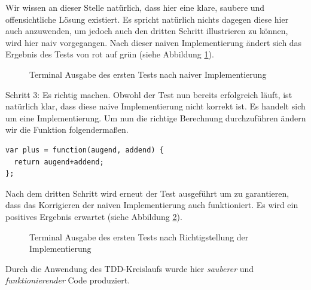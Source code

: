 Wir wissen an dieser Stelle natürlich, dass hier eine klare, saubere und offensichtliche Lösung existiert. Es spricht natürlich nichts dagegen diese hier auch anzuwenden, um jedoch auch den dritten Schritt illustrieren zu können, wird hier naiv vorgegangen.\newline
Nach dieser naiven Implementierung ändert sich das Ergebnis des Tests von rot auf grün (siehe Abbildung \ref{figure:tdd-simple-step-1-2}).

\begin{figure}[H]
  \centering
  \caption{Terminal Ausgabe des ersten Tests nach naiver Implementierung}
  \label{figure:tdd-simple-step-1-2}
\end{figure}

Schritt 3: Es richtig machen.
Obwohl der Test nun bereits erfolgreich läuft, ist natürlich klar, dass diese naive Implementierung nicht korrekt ist. Es handelt sich um eine  Implementierung. Um nun die richtige Berechnung durchzuführen ändern wir die  Funktion folgendermaßen.

\begin{lstlisting}[style=verbo]
var plus = function(augend, addend) {
  return augend+addend;
};
\end{lstlisting}

Nach dem dritten Schritt wird erneut der Test ausgeführt um zu garantieren, dass das Korrigieren der naiven Implementierung auch funktioniert. Es wird ein positives Ergebnis erwartet (siehe Abbildung \ref{figure:tdd-simple-step-1-3}).

\begin{figure}[H]
  \centering
  \caption{Terminal Ausgabe des ersten Tests nach Richtigstellung der Implementierung}
  \label{figure:tdd-simple-step-1-3}
\end{figure}

Durch die Anwendung des TDD-Kreislaufs wurde hier \textit{sauberer} und \textit{funktionierender} Code produziert.\newline\newline

